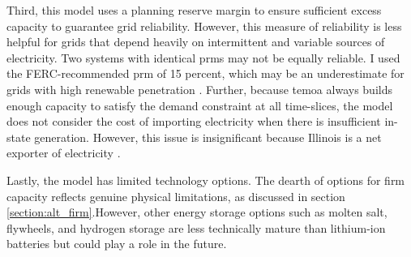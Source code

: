 Third, this model uses a planning reserve margin to ensure sufficient
excess capacity to guarantee grid reliability. However, this measure of reliability
is less helpful for grids that depend heavily on intermittent and variable sources
of electricity. Two systems with identical \glspl{prm} may not be equally reliable.
I used the FERC-recommended \gls{prm} of 15 percent, which may be
an underestimate for grids with high renewable penetration \cite{milligan_methods_2011}.
Further, because \gls{temoa} always builds enough capacity to satisfy the demand
constraint at all time-slices, the model does not consider the cost of
importing electricity when there is insufficient in-state generation. However,
this issue is insignificant because Illinois is a net exporter of electricity
\cite{energy_information_administration_eia_nodate}.

Lastly, the model has limited technology options. The dearth of options for
firm capacity reflects genuine physical limitations, as discussed in section
\ref{section:alt_firm}.However, other energy storage options such as
molten salt, flywheels, and hydrogen storage are less technically mature
than lithium-ion batteries but could play a role in the future.
